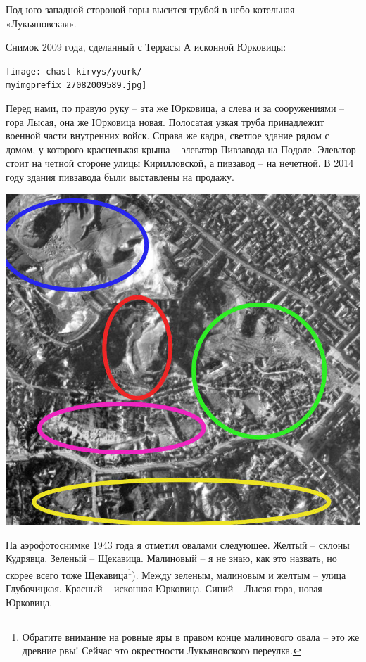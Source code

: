 Под юго-западной стороной горы высится трубой в небо котельная «Лукьяновская».

Снимок 2009 года, сделанный с Террасы А исконной Юрковицы: 

\begin{center}
\texttt{[image: chast-kirvys/yourk/\\myimgprefix 27082009589.jpg]}
\end{center} 

Перед нами, по правую руку – эта же Юрковица, а слева и за сооружениями – гора Лысая, она же Юрковица новая. Полосатая узкая труба принадлежит военной части внутренних войск. Справа же кадра, светлое здание рядом с домом, у которого красненькая крыша – элеватор Пивзавода на Подоле. Элеватор стоит на четной стороне улицы Кирилловской, а пивзавод – на нечетной. В 2014 году здания пивзавода были выставлены на продажу.

\begin{center}
\includegraphics[width=\linewidth]{chast-kirvys/yourk/y.jpg}
\end{center} 

На аэрофотоснимке 1943 года я отметил овалами следующее. Желтый – склоны Кудрявца. Зеленый – Щекавица. Малиновый – я не знаю, как это назвать, но скорее всего тоже Щекавица\footnote{Обратите внимание на ровные яры в правом конце малинового овала – это же древние рвы! Сейчас это окрестности Лукьяновского переулка.}). Между зеленым, малиновым и желтым – улица Глубочицкая. Красный – исконная Юрковица. Синий – Лысая гора, новая Юрковица.


